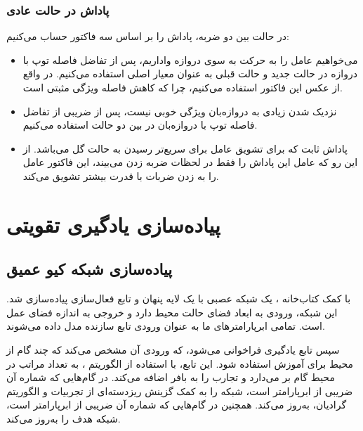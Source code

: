 \subsubsection{پاداش در حالت عادی}
در حالت بین دو ضربه، پاداش را بر اساس سه فاکتور حساب می‌کنیم:
\begin{itemize}
    \item می‌خواهیم عامل را به حرکت به سوی دروازه واداریم، پس از تفاضل فاصله توپ با دروازه در حالت جدید و حالت قبلی به عنوان معیار اصلی استفاده می‌کنیم. در واقع از عکس این فاکتور استفاده می‌کنیم، چرا که کاهش فاصله ویژگی مثبتی است.
    \item نزدیک شدن زیادی به دروازه‌بان ویژگی خوبی نیست، پس از ضریبی از تفاضل فاصله توپ با دروازه‌بان در بین دو حالت استفاده می‌کنیم.
    \item پاداش ثابت  که برای تشویق عامل برای سریع‌تر رسیدن به حالت گل می‌باشد. از این رو که عامل این پاداش را فقط در لحظات ضربه زدن می‌بیند، این فاکتور عامل را به زدن ضربات با قدرت بیشتر تشویق می‌کند.
\end{itemize}
\section{پیاده‌سازی یادگیری تقویتی}
\subsection{پیاده‌سازی شبکه کیو عمیق}
با کمک کتاب‌خانه ،
یک شبکه عصبی با یک لایه پنهان و تابع فعال‌سازی  پیاده‌سازی شد.
این شبکه، ورودی به ابعاد فضای حالت محیط دارد و خروجی به اندازه فضای عمل است.
تمامی ابرپارامتر‌های ما به عنوان ورودی تابع سازنده مدل داده می‌شوند.

سپس تابع یادگیری فراخوانی می‌شود، که ورودی آن مشخص می‌کند که چند گام از محیط برای آموزش استفاده شود.
این تابع، با استفاده از الگوریتم ،
به تعداد مراتب در محیط گام بر می‌دارد و تجارب را به بافر اضافه می‌کند. در گام‌هایی که شماره آن ضریبی از ابرپارامتر  است،
شبکه را به کمک گزینش ریزدسته‌ای از تجربیات و الگوریتم گرادیان، به‌روز می‌کند.
همچنین در گام‌هایی که شماره آن ضریبی از ابرپارامتر  است،
شبکه هدف را به‌روز می‌کند.

